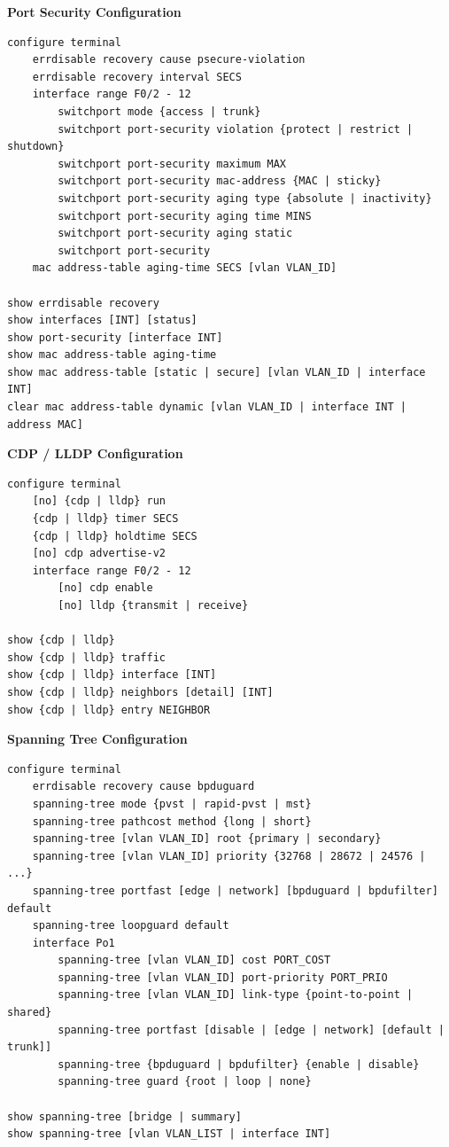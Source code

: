 \documentclass[12pt]{article}
\begin{document}
	\textbf{Port Security Configuration}
	\begin{lstlisting}
configure terminal
	errdisable recovery cause psecure-violation
	errdisable recovery interval SECS
	interface range F0/2 - 12
		switchport mode {access | trunk}
		switchport port-security violation {protect | restrict | shutdown}
		switchport port-security maximum MAX
		switchport port-security mac-address {MAC | sticky}
		switchport port-security aging type {absolute | inactivity}
		switchport port-security aging time MINS
		switchport port-security aging static
		switchport port-security
	mac address-table aging-time SECS [vlan VLAN_ID]

show errdisable recovery
show interfaces [INT] [status]
show port-security [interface INT]
show mac address-table aging-time
show mac address-table [static | secure] [vlan VLAN_ID | interface INT]
clear mac address-table dynamic [vlan VLAN_ID | interface INT | address MAC]
	\end{lstlisting}

	\textbf{CDP / LLDP Configuration}
	\begin{lstlisting}
configure terminal
	[no] {cdp | lldp} run
	{cdp | lldp} timer SECS
	{cdp | lldp} holdtime SECS
	[no] cdp advertise-v2
	interface range F0/2 - 12
		[no] cdp enable
		[no] lldp {transmit | receive}

show {cdp | lldp}
show {cdp | lldp} traffic
show {cdp | lldp} interface [INT]
show {cdp | lldp} neighbors [detail] [INT]
show {cdp | lldp} entry NEIGHBOR
	\end{lstlisting}

	\textbf{Spanning Tree Configuration}
	\begin{lstlisting}
configure terminal
	errdisable recovery cause bpduguard
	spanning-tree mode {pvst | rapid-pvst | mst}
	spanning-tree pathcost method {long | short}
	spanning-tree [vlan VLAN_ID] root {primary | secondary}
	spanning-tree [vlan VLAN_ID] priority {32768 | 28672 | 24576 | ...}
	spanning-tree portfast [edge | network] [bpduguard | bpdufilter] default
	spanning-tree loopguard default
	interface Po1
		spanning-tree [vlan VLAN_ID] cost PORT_COST
		spanning-tree [vlan VLAN_ID] port-priority PORT_PRIO
		spanning-tree [vlan VLAN_ID] link-type {point-to-point | shared}
		spanning-tree portfast [disable | [edge | network] [default | trunk]]
		spanning-tree {bpduguard | bpdufilter} {enable | disable}
		spanning-tree guard {root | loop | none}

show spanning-tree [bridge | summary]
show spanning-tree [vlan VLAN_LIST | interface INT]
	\end{lstlisting}
\end{document}
